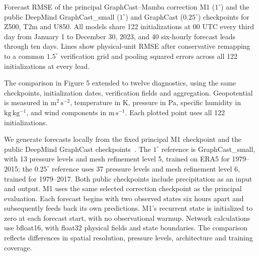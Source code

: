 
Forecast RMSE of the principal GraphCast--Mamba correction M1 ($1^\circ$)
and the public DeepMind GraphCast\_small ($1^\circ$) and GraphCast
($0.25^\circ$) checkpoints for Z500, T2m and U850.
All models share 122 initializations at 00 UTC every third day from
January 1 to December 30, 2023, and 40 six-hourly forecast leads through
ten days. Lines show physical-unit RMSE after conservative remapping to
a common $1.5^\circ$ verification grid and pooling squared errors across
all 122 initializations at every lead.

The comparison in Figure 5 extended to twelve diagnostics, using the same
checkpoints, initialization dates, verification fields and aggregation.
Geopotential is measured in $\mathrm{m^2\,s^{-2}}$, temperature in K,
pressure in Pa, specific humidity in $\mathrm{kg\,kg^{-1}}$, and wind
components in $\mathrm{m\,s^{-1}}$. Each plotted point uses all 122
initializations.

We generate forecasts locally from the fixed principal M1 checkpoint and
the public DeepMind GraphCast checkpoints~\citep{lam2023graphcast}.
The $1^\circ$ reference is GraphCast\_small, with 13 pressure levels and
mesh refinement level 5, trained on ERA5 for 1979--2015; the $0.25^\circ$
reference uses 37 pressure levels and mesh refinement level 6, trained for
1979--2017. Both public checkpoints include precipitation as an input and
output. M1 uses the same selected correction checkpoint as the principal
evaluation. Each forecast begins with two observed states six hours apart
and subsequently feeds back its own predictions. M1's recurrent state is
initialized to zero at each forecast start, with no observational warmup.
Network calculations use bfloat16, with float32 physical fields and state
boundaries. The comparison reflects differences in spatial resolution,
pressure levels, architecture and training coverage.

